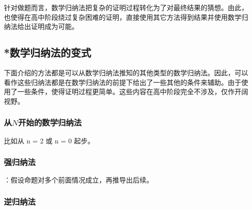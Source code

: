 针对做题而言，数学归纳法把复杂的证明过程转化为了对最终结果的猜想。由此，也使得在高中阶段绕过复杂困难的证明，直接使用其它方法得到结果并使用数学归纳法给出证明成为可能。

\subsection{*数学归纳法的变式}

下面介绍的方法都是可以从数学归纳法推知的其他类型的数学归纳法。因此，可以看作这些归纳法都是在数学归纳法的前提下给出了一些其他的条件来辅助。由于使用了一些条件，使得证明过程更简单。这些内容在高中阶段完全不涉及，仅作开阔视野。

\subsubsection{从$N$开始的数学归纳法}
比如从 n = 2 或 n = 0 起步。

\subsubsection{强归纳法}

：假设命题对多个前面情况成立，再推导出后续。

\subsubsection{逆归纳法}
